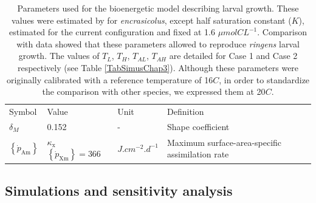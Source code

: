 \begin{table}[H]
\begin{adjustbox}{width=1.0\textwidth}
\begin{tabular}{l|l|l|l}
\hline
Symbol		& 
Value		& 
Unit		& 
Definition	\\
$\delta_{M}$		& 
0.152				& 
-					& 
Shape coefficient	\\
$\left \{ \dot{p}_\mathrm{Am} \right \}$								& 
$\kappa_{\mathrm{x}} $ $\left \{ \dot{p}_\mathrm{Xm} \right \}=366$	&
$J.cm^{-2}.d^{-1}$														& 
Maximum surface-area-specific assimilation rate						\\
\hline
\end{tabular}
\end{adjustbox}
\caption{Parameters used for the bioenergetic model describing larval growth. These values were estimated by \cite{PethRoos2013} for \textit{\gls{encrasicolus}}, except half saturation constant ($K$), estimated for the current configuration and fixed at 1.6 $\mu mol CL^{-1}$. Comparison with data showed that these parameters allowed to reproduce \textit{\gls{ringens}} larval growth. The values of $T_{L}$, $T_{H}$, $T_{AL}$, $T_{AH}$ are detailed for Case 1 and Case 2 respectively (see Table \ref{TabSimusChap3}). Although these parameters were originally calibrated with a reference temperature of 16\textdegree $C$, in order to standardize the comparison with other species, we expressed them at 20\textdegree $C$.}
\label{TabDEBparEncra}
\end{table}

\subsection{Simulations and sensitivity analysis}

